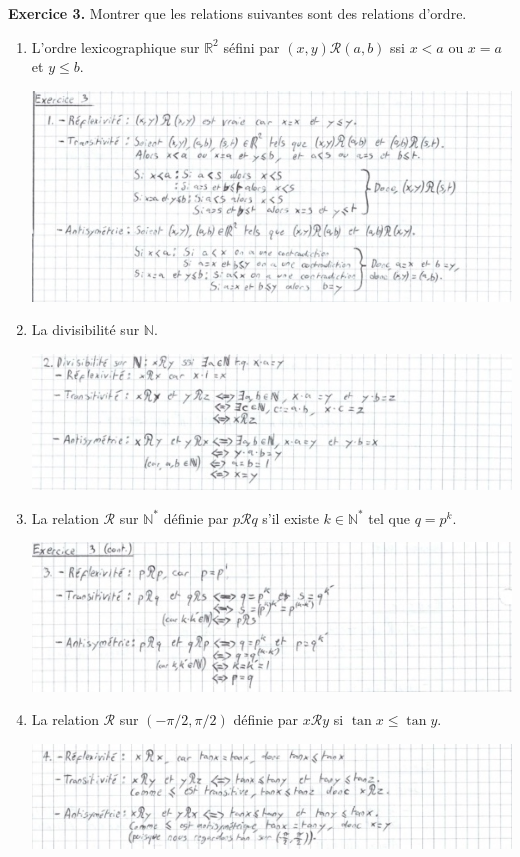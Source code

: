 \documentclass[a4paper, 10pt]{report}
\begin{document}
	\newpage
	
	\fancyhf{}
	\renewcommand{\headrule}
	{\rule{\textwidth}{0pt}}
	
	\noindent
	\textbf{Exercice 3.} Montrer que les relations suivantes sont des
	relations d'ordre.
	
	\begin{enumerate}[label=\arabic*.]
		\item L'ordre lexicographique sur $\mathbb{R}^2$ séfini par
		$(x, y)\mathcal{R}(a, b)$ ssi $x < a$ ou $x = a$ et $y \leq b$.
		
		\includegraphics{ex03-p1.jpg}
		
		\item La divisibilité sur $\mathbb{N}$.
		
		\includegraphics{ex03-p2.jpg}
		
		\item La relation $\mathcal{R}$ sur $\mathbb{N}^*$ définie par
		$p\mathcal{R}q$ s'il existe $k \in \mathbb{N}^*$ tel que $q = p^k$.
		
		\includegraphics{ex03-p3.jpg}
		
		\item La relation $\mathcal{R}$ sur $(- \pi/2, \pi/2)$ définie par
		$x\mathcal{R}y$ si $\tan x \leq \tan y$.
		
		\includegraphics{ex03-p4.jpg}
	\end{enumerate}	
	
\end{document}
